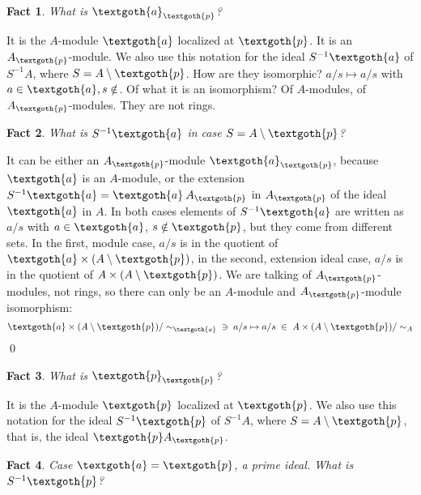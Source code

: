 \documentclass{article}
\newtheorem{theorem}{Fact}[section]
\begin{document}
\begin{theorem}
What is $\textgoth{a}_\textgoth{p}$?
\end{theorem}

\noindent
It is the $A$-module $\textgoth{a}$ localized at $\textgoth{p}$. It is an $A_\textgoth{p}$-module. We also use this notation for the ideal $S^{-1}\textgoth{a}$ of $S^{-1}A$, where $S = A \setminus \textgoth{p}$. How are they isomorphic? $a/s \mapsto a/s$ with $a \in \textgoth{a}, s \notin $.  Of what it is an isomorphism? Of $A$-modules, of $A_\textgoth{p}$-modules. They are not rings.


\begin{theorem}
What is $S^{-1}\textgoth{a}$ in case $S = A \setminus \textgoth{p}$?
\end{theorem}

\noindent
It can be either an $A_\textgoth{p}$-module $\textgoth{a}_\textgoth{p}$, because $\textgoth{a}$ is an $A$-module, or the extension $S^{-1}\textgoth{a} = \textgoth{a} \: A_\textgoth{p}$ in $A_\textgoth{p}$ of the ideal $\textgoth{a}$ in $A$. In both cases elements of $S^{-1}\textgoth{a}$ are written as $a/s$ with $a \in \textgoth{a}$, $s \notin \textgoth{p}$, but they come from different sets. In the first, module case, $a/s$ is in the quotient of $\textgoth{a} \times (A \setminus\textgoth{p})$, in the second, extension ideal case, $a/s$ is in the quotient of $A \times (A \setminus\textgoth{p})$. We are talking of $A_\textgoth{p}$-modules, not rings, so there can only be an $A$-module and $A_\textgoth{p}$-module isomorphism:
\[
  \textgoth{a} \times (A \setminus\textgoth{p}) / \sim_\textgoth{a} \; \; \ni \; a/s \mapsto a/s \; \in \; A \times (A \setminus\textgoth{p}) / \sim_A
\]
\qed

\begin{theorem}
What is $\textgoth{p}_\textgoth{p}$?
\end{theorem}

\noindent
It is the $A$-module $\textgoth{p}$ localized at $\textgoth{p}$. We also use this notation for the ideal $S^{-1}\textgoth{p}$ of $S^{-1}A$, where $S = A \setminus \textgoth{p}$, that is, the ideal $\textgoth{p}A_\textgoth{p}$.

\begin{theorem}
Case $\textgoth{a} = \textgoth{p}$, a prime ideal. What is $S^{-1}\textgoth{p}$?
\end{theorem}
\end{document}
